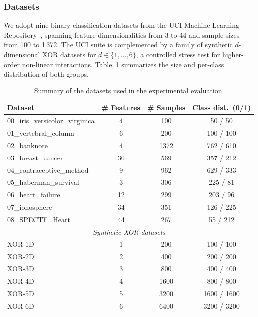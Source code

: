\documentclass{ieeeaccess}
\begin{document}
\subsubsection{Datasets}\label{sec:datasets}

We adopt nine binary classification datasets from the UCI Machine Learning
Repository~\cite{Dua:2019}, spanning feature dimensionalities from 3 to 44 and
sample sizes from 100 to 1\,372. The UCI suite is
complemented by a family of synthetic $d$-dimensional XOR datasets for
$d \in \{1,\dots,6\}$, a controlled stress test for higher-order non-linear
interactions. Table~\ref{tab:datasets} summarizes the size and per-class
distribution of both groups.

\begin{table}[H]
\centering
\caption{Summary of the datasets used in the experimental evaluation.}
\label{tab:datasets}
\begin{tabular}{lccc}
\hline
Dataset                         & \# Features & \# Samples & Class dist.\ (0/1) \\
\hline
00\_iris\_versicolor\_virginica & 4           & 100          & 50 / 50      \\
01\_vertebral\_column           & 6           & 200         & 100 / 100    \\
02\_banknote                    & 4           & 1372        & 762 / 610    \\
03\_breast\_cancer              & 30          & 569         & 357 / 212    \\
04\_contraceptive\_method       & 9           & 962         & 629 / 333    \\
05\_haberman\_survival          & 3           & 306         & 225 / 81     \\
06\_heart\_failure              & 12          & 299         & 203 / 96     \\
07\_ionosphere                  & 34          & 351         & 126 / 225    \\
08\_SPECTF\_Heart               & 44          & 267         & 55 / 212     \\
\multicolumn{4}{c}{\textit{Synthetic XOR datasets}} \\
XOR-1D                          & 1           & 200         & 100 / 100    \\
XOR-2D                          & 2           & 400         & 200 / 200    \\
XOR-3D                          & 3           & 800         & 400 / 400    \\
XOR-4D                          & 4           & 1600        & 800 / 800    \\
XOR-5D                          & 5           & 3200        & 1600 / 1600  \\
XOR-6D                          & 6           & 6400        & 3200 / 3200  \\
\hline
\end{tabular}
\end{table}
\end{document}
